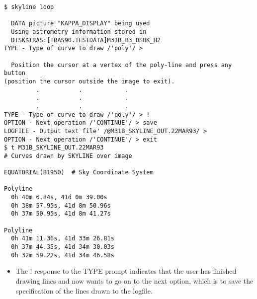 \begin{small}
\begin{verbatim}
$ skyline loop

  DATA picture "KAPPA_DISPLAY" being used
  Using astrometry information stored in
  DISK$IRAS:[IRAS90.TESTDATA]M31B_B3_DSBK_H2
TYPE - Type of curve to draw /'poly'/ > 

  Position the cursor at a vertex of the poly-line and press any button
(position the cursor outside the image to exit).
         .           .            .
         .           .            .
         .           .            .
TYPE - Type of curve to draw /'poly'/ > !
OPTION - Next operation /'CONTINUE'/ > save
LOGFILE - Output text file' /@M31B_SKYLINE_OUT.22MAR93/ > 
OPTION - Next operation /'CONTINUE'/ > exit
$ t M31B_SKYLINE_OUT.22MAR93
# Curves drawn by SKYLINE over image
 
EQUATORIAL(B1950)  # Sky Coordinate System
 
Polyline
  0h 40m 6.84s, 41d 0m 39.00s
  0h 38m 57.95s, 41d 8m 50.96s
  0h 37m 50.95s, 41d 8m 41.27s
 
Polyline
  0h 41m 11.36s, 41d 33m 26.81s
  0h 37m 44.35s, 41d 34m 30.03s
  0h 32m 59.22s, 41d 34m 46.58s
\end{verbatim}
\end{small}
\begin{itemize}
\item The ! response to the TYPE prompt indicates that the user has finished
drawing lines and now wants to go on to the next option, which is to save the
specification of the lines drawn to the logfile.
\end{itemize}

